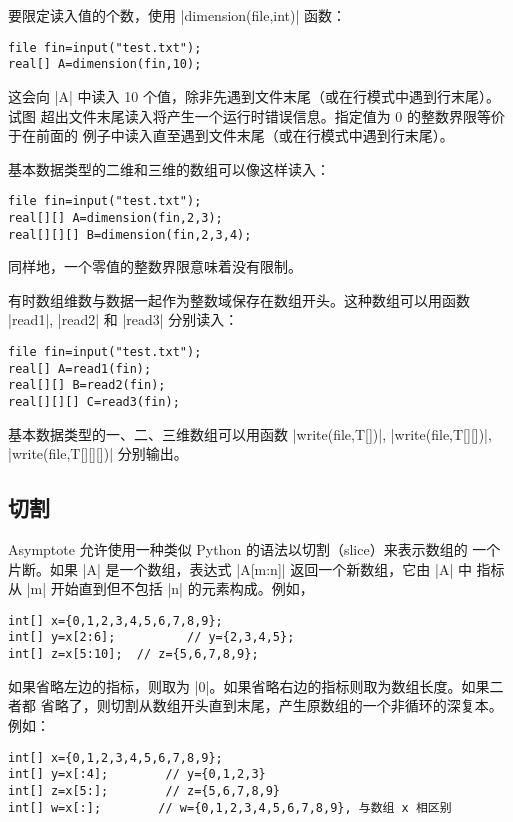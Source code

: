 \documentclass{ctexbook}
\newcommand*\prgname[1]{\textsf{#1}}
\begin{document}
{{{
要限定读入值的个数，使用 |dimension(file,int)| 函数：
\begin{lstlisting}
file fin=input("test.txt");
real[] A=dimension(fin,10);
\end{lstlisting}

这会向 |A| 中读入 10 个值，除非先遇到文件末尾（或在行模式中遇到行末尾）。试图
超出文件末尾读入将产生一个运行时错误信息。指定值为 0 的整数界限等价于在前面的
例子中读入直至遇到文件末尾（或在行模式中遇到行末尾）。

基本数据类型的二维和三维的数组可以像这样读入：
\begin{lstlisting}
file fin=input("test.txt");
real[][] A=dimension(fin,2,3);
real[][][] B=dimension(fin,2,3,4);
\end{lstlisting}
同样地，一个零值的整数界限意味着没有限制。

有时数组维数与数据一起作为整数域保存在数组开头。这种数组可以用函数 |read1|,
|read2| 和 |read3| 分别读入：
\begin{lstlisting}
file fin=input("test.txt");
real[] A=read1(fin);
real[][] B=read2(fin);
real[][][] C=read3(fin);
\end{lstlisting}

基本数据类型的一、二、三维数组可以用函数 |write(file,T[])|,
|write(file,T[][])|, |write(file,T[][][])| 分别输出。


\subsection{切割}

\prgname{Asymptote} 允许使用一种类似 Python 的语法以切割（slice）来表示数组的
一个片断。如果 |A| 是一个数组，表达式 |A[m:n]| 返回一个新数组，它由 |A| 中
指标从 |m| 开始直到但不包括 |n| 的元素构成。例如，
\begin{lstlisting}
int[] x={0,1,2,3,4,5,6,7,8,9};
int[] y=x[2:6];          // y={2,3,4,5};
int[] z=x[5:10];  // z={5,6,7,8,9};
\end{lstlisting}

如果省略左边的指标，则取为 |0|。如果省略右边的指标则取为数组长度。如果二者都
省略了，则切割从数组开头直到末尾，产生原数组的一个非循环的深复本。例如：
\begin{lstlisting}
int[] x={0,1,2,3,4,5,6,7,8,9};
int[] y=x[:4];        // y={0,1,2,3}
int[] z=x[5:];        // z={5,6,7,8,9}
int[] w=x[:];        // w={0,1,2,3,4,5,6,7,8,9}, 与数组 x 相区别
\end{lstlisting}

}}}
\end{document}
